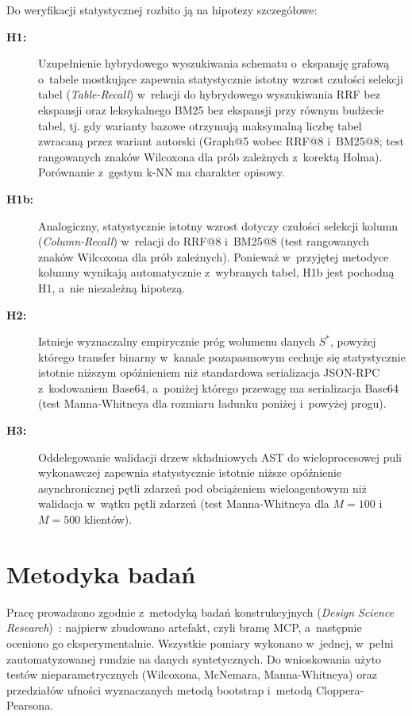 Do weryfikacji statystycznej rozbito ją na hipotezy szczegółowe:
\begin{description}
    \item[\textbf{H1:}] Uzupełnienie hybrydowego wyszukiwania schematu o~ekspansję grafową o~tabele mostkujące zapewnia statystycznie istotny wzrost czułości selekcji tabel (\emph{Table-Recall}) w~relacji do hybrydowego wyszukiwania RRF bez ekspansji oraz leksykalnego BM25 bez ekspansji przy równym budżecie tabel, tj. gdy warianty bazowe otrzymują maksymalną liczbę tabel zwracaną przez wariant autorski (Graph@5 wobec RRF@8 i~BM25@8; test rangowanych znaków Wilcoxona dla prób zależnych z~korektą Holma). Porównanie z~gęstym k-NN ma charakter opisowy.
    \item[\textbf{H1b:}] Analogiczny, statystycznie istotny wzrost dotyczy czułości selekcji kolumn (\emph{Column-Recall}) w~relacji do RRF@8 i~BM25@8 (test rangowanych znaków Wilcoxona dla prób zależnych). Ponieważ w~przyjętej metodyce kolumny wynikają automatycznie z~wybranych tabel, H1b jest pochodną H1, a~nie niezależną hipotezą.
    \item[\textbf{H2:}] Istnieje wyznaczalny empirycznie próg wolumenu danych $S^*$, powyżej którego transfer binarny w~kanale pozapasmowym cechuje się statystycznie istotnie niższym opóźnieniem niż standardowa serializacja JSON-RPC z~kodowaniem Base64, a~poniżej którego przewagę ma serializacja Base64 (test Manna-Whitneya dla rozmiaru ładunku poniżej i~powyżej progu).
    \item[\textbf{H3:}] Oddelegowanie walidacji drzew składniowych AST do wieloprocesowej puli wykonawczej zapewnia statystycznie istotnie niższe opóźnienie asynchronicznej pętli zdarzeń pod obciążeniem wieloagentowym niż walidacja w~wątku pętli zdarzeń (test Manna-Whitneya dla $M = 100$ i~$M = 500$ klientów).
\end{description}


\section{Metodyka badań}
\label{sec:wstep_metodologia}

Pracę prowadzono zgodnie z~metodyką badań konstrukcyjnych (\emph{Design Science Research})~\cite{peffers2007dsr}: najpierw zbudowano artefakt, czyli bramę MCP, a~następnie oceniono go eksperymentalnie. Wszystkie pomiary wykonano w~jednej, w~pełni zautomatyzowanej rundzie na danych syntetycznych. Do wnioskowania użyto testów nieparametrycznych (Wilcoxona, McNemara, Manna-Whitneya) oraz przedziałów ufności wyznaczanych metodą bootstrap i~metodą Cloppera-Pearsona.


